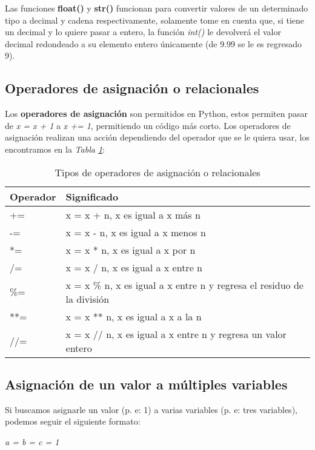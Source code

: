 Las funciones \textbf{float()} y \textbf{str()} funcionan para convertir valores de un determinado tipo a decimal y cadena respectivamente, solamente tome en cuenta que, si tiene un decimal y lo quiere pasar a entero, la función \textit{int()} le devolverá el valor decimal redondeado a su elemento entero únicamente (de 9.99 se le es regresado 9).


\subsection{Operadores de asignación o relacionales}
\hspace{0.55cm}Los \textbf{operadores de asignación} son permitidos en Python, estos permiten pasar de \textit{x = x + 1} a \textit{x += 1}, permitiendo un código más corto. Los operadores de asignación realizan una acción dependiendo del operador que se le quiera usar, los encontramos en la \textit{Tabla \ref{tab: 6}}:
\begin{table}[H]
    \begin{center}
        \caption{Tipos de operadores de asignación o relacionales}
        \label{tab: 6}
        \begin{tabular}{m{3cm} m{10cm}}
            \hline
            \textbf{Operador} & \textbf{Significado} \\
            \hline
            +=		& x = x + n, x es igual a x más n \\
            -=		& x = x - n, x es igual a x menos n \\
            *=		& x = x * n, x es igual a x por n \\
            /=		& x = x / n, x es igual a x entre n \\
            \%=		& x = x \% n, x es igual a x entre n y regresa el residuo de la división \\
            **=		& x = x ** n, x es igual a x a la n \\
            //=		& x = x // n, x es igual a x entre n y regresa un valor entero \\
            \hline
        \end{tabular}
    \end{center}
\end{table}


\subsection{Asignación de un valor a múltiples variables}
\hspace{0.55cm}Si buscamos asignarle un valor (p. e: 1) a varias variables (p. e: tres variables), podemos seguir el siguiente formato:
\begin{center}
	\textit{a = b = c = 1}
\end{center}

